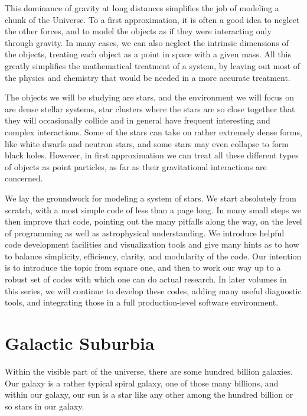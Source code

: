 \documentclass{book}
\begin{document}
This dominance of gravity at long distances simplifies the job of
modeling a chunk of the Universe.  To a first approximation, it
is often a good idea to neglect the other forces, and to model the
objects as if they were interacting only through gravity.  In many
cases, we can also neglect the intrinsic dimensions of the objects,
treating each object as a point in space with a given mass.  All this
greatly simplifies the mathematical treatment of a system, by leaving
out most of the physics and chemistry that would be needed in a more
accurate treatment.

The objects we will be studying are stars, and the environment we will
focus on are dense stellar systems, star clusters where the stars are
so close together that they will occasionally collide and in general
have frequent interesting and complex interactions.  Some of the stars
can take on rather extremely dense forms, like white dwarfs and
neutron stars, and some stars may even collapse to form black holes.
However, in first approximation we can treat all these different types
of objects as point particles, as far as their gravitational
interactions are concerned.

We lay the groundwork for modeling a system of stars.  We start
absolutely from scratch, with a most simple code of less than a page
long.  In many small steps we then improve that code, pointing out the
many pitfalls along the way, on the level of programming as well as
astrophysical understanding.  We introduce helpful code development
facilities and visualization tools and give many hints as to how to
balance simplicity, efficiency, clarity, and modularity of the code.
Our intention is to introduce the topic from square one, and then to
work our way up to a robust set of codes with which one can do actual
research.  In later volumes in this series, we will continue to
develop these codes, adding many useful diagnostic tools, and
integrating those in a full production-level software environment.

\section{  Galactic Suburbia}
\label{sect:5}

Within the visible part of the universe, there are some hundred
billion galaxies.  Our galaxy is a rather typical spiral galaxy,
one of those many billions, and within our galaxy, our sun is a star
like any other among the hundred billion or so stars in our galaxy.
\end{document}
